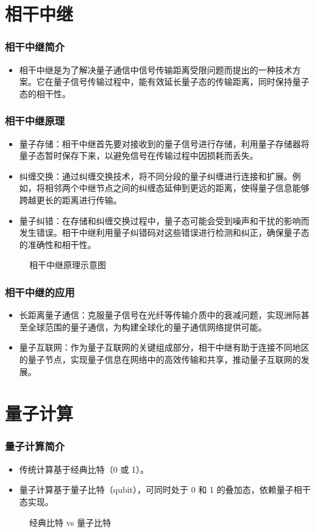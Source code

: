 \section{相干中继}
\begin{frame}
    \frametitle{相干中继简介}
    \begin{itemize}
        \item 相干中继是为了解决量子通信中信号传输距离受限问题而提出的一种技术方案。它在量子信号传输过程中，能有效延长量子态的传输距离，同时保持量子态的相干性。
    \end{itemize}
\end{frame}

\begin{frame}
    \frametitle{相干中继原理}
    \begin{itemize}
        \item 量子存储：相干中继首先要对接收到的量子信号进行存储，利用量子存储器将量子态暂时保存下来，以避免信号在传输过程中因损耗而丢失。
        \item 纠缠交换：通过纠缠交换技术，将不同分段的量子纠缠进行连接和扩展。例如，将相邻两个中继节点之间的纠缠态延伸到更远的距离，使得量子信息能够跨越更长的距离进行传输。
        \item 量子纠错：在存储和纠缠交换过程中，量子态可能会受到噪声和干扰的影响而发生错误。相干中继利用量子纠错码对这些错误进行检测和纠正，确保量子态的准确性和相干性。
    \end{itemize}
    \begin{figure}
        \centering
        \caption{相干中继原理示意图}
    \end{figure}
\end{frame}

\begin{frame}
    \frametitle{相干中继的应用}
    \begin{itemize}
        \item 长距离量子通信：克服量子信号在光纤等传输介质中的衰减问题，实现洲际甚至全球范围的量子通信，为构建全球化的量子通信网络提供可能。
        \item 量子互联网：作为量子互联网的关键组成部分，相干中继有助于连接不同地区的量子节点，实现量子信息在网络中的高效传输和共享，推动量子互联网的发展。
    \end{itemize}
\end{frame}

\section{量子计算}
\begin{frame}
    \frametitle{量子计算简介}
    \begin{itemize}
        \item 传统计算基于经典比特（0 或 1）。
        \item 量子计算基于量子比特（qubit），可同时处于 0 和 1 的叠加态，依赖量子相干态实现。
    \end{itemize}
    \begin{figure}
        \centering
        \caption{经典比特 vs 量子比特}
    \end{figure}
\end{frame}

